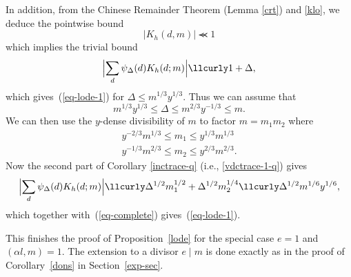 \documentclass[12pt,a4paper,reqno]{amsart}
\numberwithin{equation}{section}
\theoremstyle{plain}
\theoremstyle{definition}
\renewcommand{\lessapprox}{\llcurly}
\begin{document}
In addition, from the Chinese Remainder Theorem (Lemma \ref{crt})
and \eqref{klo}, we deduce the pointwise bound
\begin{equation}\label{kqd}
|K_h(d,m)| \lessapprox 1
\end{equation}
which implies the trivial bound
$$
\Bigl|\sum_d \psi_{\Delta}(d) K_h(d;m)\Bigr| \lessapprox 1+\Delta,
$$
which gives~(\ref{eq-lode-1}) for $\Delta\leq m^{1/3}y^{1/3}$. Thus we
can assume that
$$
m^{1/3}y^{1/3}\leq \Delta\leq m^{2/3}y^{-1/3}\leq m.
$$
We can then use the $y$-dense divisibility of $m$ to factor $m=m_1m_2$
where
\begin{gather*}
y^{-2/3}m^{1/3}\leq m_1\leq y^{1/3}m^{1/3}\\
y^{-1/3}m^{2/3}\leq m_2\leq y^{2/3}m^{2/3}.
\end{gather*}
Now the second part of Corollary \ref{inctrace-q} (i.e., \eqref{vdctrace-1-q}) gives
$$ 
\Bigl|\sum_d \psi_{\Delta}(d) K_h(d;m)\Bigr| \lessapprox
\Delta^{1/2}m_1^{1/2} + \Delta^{1/2}m_2^{1/4}\lessapprox
\Delta^{1/2}m^{1/6}y^{1/6},
$$
which together with~(\ref{eq-complete}) gives~(\ref{eq-lode-1}). 
\par
This
finishes the proof of Proposition~\ref{lode} for the special case
$e=1$ and $(\alpha l,m)=1$. The extension to a divisor $e\mid m$ is done
exactly as in the proof of Corollary~\ref{dons} in
Section~\ref{exp-sec}.
\end{document}
